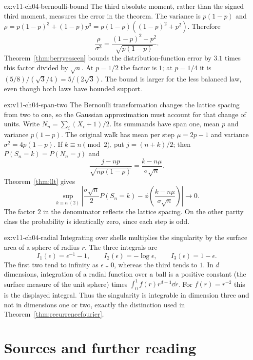 \begin{solution}{ex:v11-ch04-bernoulli-bound}
\idea The third absolute moment, rather than the signed third moment, measures the error in the theorem.
\writeup The variance is $p(1-p)$ and
$\rho=p(1-p)^3+(1-p)p^3=p(1-p)((1-p)^2+p^2)$. Therefore
\[
\frac{\rho}{\sigma^3}=\frac{(1-p)^2+p^2}{\sqrt{p(1-p)}}.
\]
Theorem~\ref{thm:berryesseen} bounds the distribution-function error by $3.1$ times this factor divided by $\sqrt n$. At $p=1/2$ the factor is $1$; at $p=1/4$ it is $(5/8)/(\sqrt3/4)=5/(2\sqrt3)$. The bound is larger for the less balanced law, even though both laws have bounded support.
\end{solution}

\begin{solution}{ex:v11-ch04-span-two}
\idea The Bernoulli transformation changes the lattice spacing from two to one, so the Gaussian approximation must account for that change of units.
\writeup Write $N_n=\sum_i(X_i+1)/2$. Its summands have span one, mean $p$ and variance $p(1-p)$. The original walk has mean per step $\mu=2p-1$ and variance $\sigma^2=4p(1-p)$. If $k\equiv n\pmod2$, put $j=(n+k)/2$; then $P(S_n=k)=P(N_n=j)$ and
\[
\frac{j-np}{\sqrt{np(1-p)}}=\frac{k-n\mu}{\sigma\sqrt n}.
\]
Theorem~\ref{thm:llt} gives
\[
\sup_{k\equiv n\ (2)}
\left|\frac{\sigma\sqrt n}{2}P(S_n=k)-\phi\left(\frac{k-n\mu}{\sigma\sqrt n}\right)\right|\longrightarrow0.
\]
The factor $2$ in the denominator reflects the lattice spacing. On the other parity class the probability is identically zero, since each step is odd.
\end{solution}

\begin{solution}{ex:v11-ch04-radial}
\idea Integrating over shells multiplies the singularity by the surface area of a sphere of radius $r$.
\writeup The three integrals are
\[
I_1(\epsilon)=\epsilon^{-1}-1,\qquad
I_2(\epsilon)=-\log\epsilon,\qquad
I_3(\epsilon)=1-\epsilon.
\]
The first two tend to infinity as $\epsilon\downarrow0$, whereas the third tends to $1$. In $d$ dimensions, integration of a radial function over a ball is a positive constant (the surface measure of the unit sphere) times $\int_0^1f(r)r^{d-1}\dd r$. For $f(r)=r^{-2}$ this is the displayed integral. Thus the singularity is integrable in dimension three and not in dimensions one or two, exactly the distinction used in Theorem~\ref{thm:recurrencefourier}.
\end{solution}

\section*{Sources and further reading}

